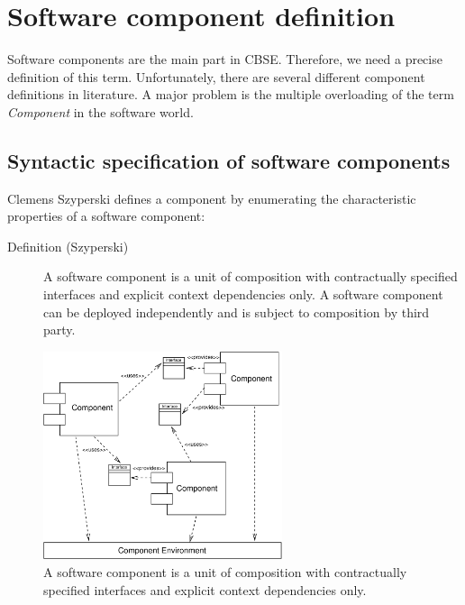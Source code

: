 \section{Software component definition}

Software components are the main part in CBSE. Therefore, we need a precise 
definition of this term.
Unfortunately, there are several different component definitions in 
literature.
A major problem is the multiple overloading of the term {\it Component} in the 
software world.


\subsection{Syntactic specification of software components}

Clemens Szyperski \cite{Szyperski02} defines a component by enumerating the 
characteristic properties of a software component:
\begin{description} 
\item [Definition (Szyperski)] A software component is a unit of composition 
with contractually specified interfaces and explicit context dependencies only.
A software component can be deployed independently and is subject to composition
by third party.
\end{description}

\begin{figure}[htbp]
    \begin{center}
        \includegraphics [width=7cm,angle=0] {Introduction/figures/Environment}
        \caption{ A software component is a unit of composition 
	with contractually specified interfaces and explicit context 
	dependencies only.}
        \label{ComponentDef}
    \end{center}
\end{figure}

